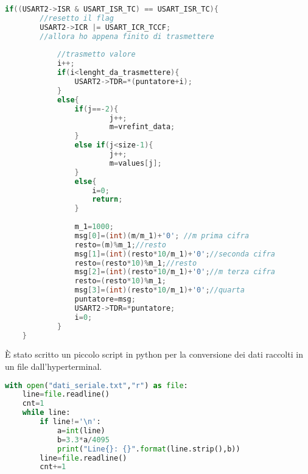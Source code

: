 \documentclass[main.tex]{subfiles}
\begin{document}
\begin{lstlisting}[caption=Interrupt USART2, language=C]
if((USART2->ISR & USART_ISR_TC) == USART_ISR_TC){
		//resetto il flag
		USART2->ICR |= USART_ICR_TCCF;
		//allora ho appena finito di trasmettere
		
			//trasmetto valore
			i++;
			if(i<lenght_da_trasmettere){
				USART2->TDR=*(puntatore+i);
			}
			else{
				if(j==-2){
						j++;
						m=vrefint_data;
				}
				else if(j<size-1){
						j++;
						m=values[j];
				}
				else{
					i=0; 
					return;
				}
				
				m_1=1000;
				msg[0]=(int)(m/m_1)+'0'; //m prima cifra
				resto=(m)%m_1;//resto
				msg[1]=(int)(resto*10/m_1)+'0';//seconda cifra
				resto=(resto*10)%m_1;//resto
				msg[2]=(int)(resto*10/m_1)+'0';//m terza cifra
				resto=(resto*10)%m_1;
				msg[3]=(int)(resto*10/m_1)+'0';//quarta
				puntatore=msg;
				USART2->TDR=*puntatore;
				i=0;
			}
	}
\end{lstlisting}
È stato scritto un piccolo script in python per la conversione dei dati raccolti in un file dall'hyperterminal. 
\begin{lstlisting}[caption=script.py,language=Python]
with open("dati_seriale.txt","r") as file:
    line=file.readline()
    cnt=1
    while line:
        if line!='\n':
            a=int(line)
            b=3.3*a/4095
            print("Line{}: {}".format(line.strip(),b))
        line=file.readline()
        cnt+=1
\end{lstlisting}
\end{document}
